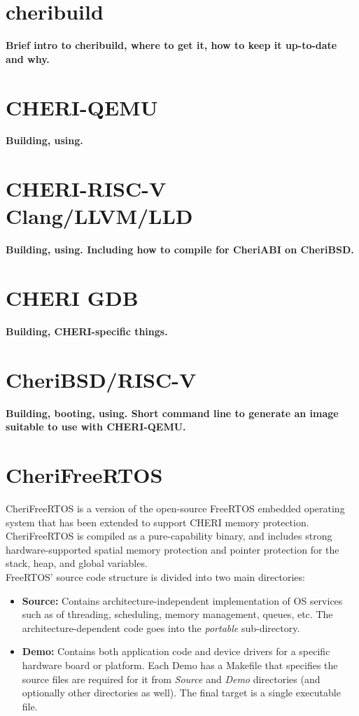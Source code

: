 \documentclass[12pt,twoside,openright,a4paper]{article}
\begin{document}
\section{cheribuild}

\textbf{Brief intro to cheribuild, where to get it, how to keep it up-to-date
  and why.}

\section{CHERI-QEMU}

\textbf{Building, using.}

\section{CHERI-RISC-V Clang/LLVM/LLD}

\textbf{Building, using.  Including how to compile for CheriABI on CheriBSD.}

\section{CHERI GDB}

\textbf{Building, CHERI-specific things.}

\section{CheriBSD/RISC-V}

\textbf{Building, booting, using.  Short command line to generate an image
  suitable to use with CHERI-QEMU.}

\section{CheriFreeRTOS}
CheriFreeRTOS is a version of the open-source FreeRTOS embedded operating
system that has been extended to support CHERI memory protection.
CheriFreeRTOS is compiled as a pure-capability binary, and includes
strong hardware-supported spatial memory protection and pointer protection
for the stack, heap, and global variables.\\

FreeRTOS' source code structure is divided into two main directories:

\begin{itemize}
	\item \textbf{Source:} Contains architecture-independent implementation
	 of OS services such as of threading, scheduling, memory management,
	 queues, etc. The architecture-dependent code goes into the
	 \textit{portable} sub-directory.
	\item \textbf{Demo:} Contains both application code and device drivers
	for a specific hardware board or platform. Each Demo has a Makefile
	that specifies the source files are required for it from
	\textit{Source} and \textit{Demo} directories (and optionally other
	directories as well). The final target is a single executable file.

\end{itemize}
\end{document}
